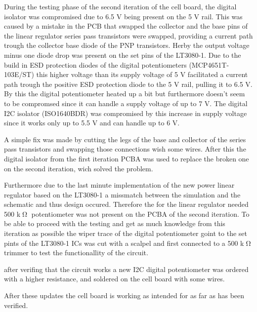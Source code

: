 During the testing phase of the second iteration of the cell board, the digital isolator was compromised due to 6.5 V being present on the 5 V rail. This was caused by a mistake in the PCB that swapped the collector and the base pins of the linear regulator series pass transistors were swapped, providing a current path trough the collector base diode of the PNP transistors. Herby the output voltage minus one diode drop was present on the set pins of the LT3080-1. Due to the build in ESD protection diodes of the digital potentiometers (MCP4651T-103E/ST) this higher voltage than its supply voltage of 5 V facilitated a current path trough the positive ESD protection diode to the 5 V rail, pulling it to 6.5 V. By this the digital potentiometer heated up a bit but furthermore doesn't seem to be compromsed since it can handle a supply voltage of up to 7 V. The digital I2C isolator (ISO1640BDR) was compromised by this increase in supply voltage since it works only up to 5.5 V and can handle up to 6 V. 

A simple fix was made by cutting the legs of the base and collector of the series pass transistors and swapping those connections wish some wires. After this the digital isolator from the first iteration PCBA was used to replace the broken one on the second iteration, wich solved the problem.

Furthermore due to the last minute implementation of the new power linear regulator based on the LT3080-1 a missmatch between the simulation and the schematic and thus design occured. Therefore the for the linear regulator needed 500 k$\tcohm$ potentiometer was not present on the PCBA of the second iteration. To be able to proceed with the testing and get as much knowledge from this iteration as possible the wiper trace of the digital potentiometer goint to the set pints of the LT3080-1 ICs was cut with a scalpel and first connected to a 500 k$\tcohm$ trimmer to test the functionallity of the circuit.

after verifing that the circuit works a new I2C digital potentiometer was ordered with a higher resistance, and soldered on the cell board with some wires.

After these updates the cell board is working as intended for as far as has been verified.